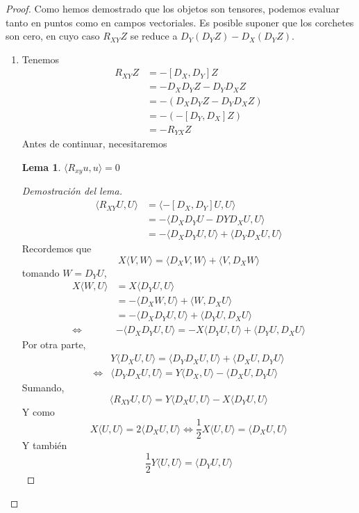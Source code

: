 \documentclass[spanish]{book}
\theoremstyle{definition}
\newtheorem*{lema}{Lema}
\begin{document}
	\begin{proof}
		Como hemos demostrado que los objetos son tensores, podemos evaluar tanto en puntos como en campos vectoriales. Es posible suponer que los corchetes son cero, en cuyo caso $R_{XY}Z$ se reduce a $D_Y(D_YZ)-D_X(D_YZ)$.
		\begin{enumerate}
			\item Tenemos
			\begin{align*}
				R_{XY}Z&=-[D_X,D_Y]Z\\
				&=-D_XD_YZ-D_YD_XZ\\
				&=-(D_XD_YZ-D_YD_XZ)\\
				&=-(-[D_Y,D_X]Z)\\
				&=-R_{YX}Z
			\end{align*}
			Antes de continuar, necesitaremos
			\begin{lema}
				$\langle R_{xy}u,u\rangle=0$
			\end{lema}
			\begin{proof}[Demostración del lema]
				\begin{align*}
					\langle R_{XY}U,U\rangle&=\langle -[D_X,D_Y]U,U\rangle\\
					&=-\langle D_XD_YU-DYD_XU,U\rangle\\
					&=-\langle D_XD_YU,U\rangle+\langle D_YD_XU,U\rangle
				\end{align*}
				Recordemos que
				\[X\langle V,W\rangle=\langle D_XV,W\rangle+\langle V,D_XW\rangle\]
				tomando $W=D_YU$,
				\begin{align*}
					X\langle W,U\rangle&=X\langle D_YU,U\rangle\\
					&=-\langle D_XW,U\rangle+\langle W,D_XU\rangle\\
					&=-\langle D_XD_YU,U\rangle+\langle D_YU,D_XU\rangle\\
					\iff&-\langle D_XD_YU,U\rangle=-X\langle D_YU,U\rangle+\langle D_YU,D_XU\rangle
				\end{align*}
				Por otra parte,
				\begin{align*}
					&Y\langle D_XU,U\rangle=\langle D_YD_XU,U\rangle+\langle D_XU,D_YU\rangle\\
					\iff&\langle D_YD_XU,U\rangle=Y\langle D_X,U\rangle-\langle D_XU,D_YU\rangle
				\end{align*}
				Sumando,
				\[\langle R_{XY}U,U\rangle=Y\langle D_XU,U\rangle-X\langle D_YU,U\rangle\]
				Y como
				\[X\langle U,U\rangle=2\langle D_XU,U\rangle\iff\frac{1}{2}X\langle U,U\rangle=\langle D_XU,U\rangle\]
				Y también
				\[\frac{1}{2}Y\langle U,U\rangle=\langle D_YU,U\rangle\]

\end{proof}
\end{enumerate}
\end{proof}
\end{document}
